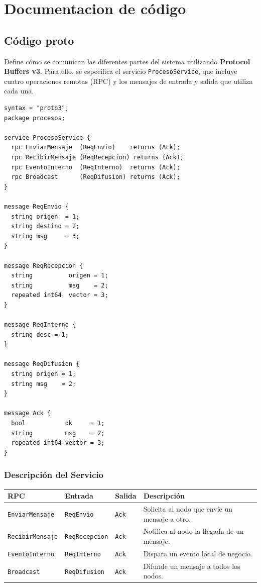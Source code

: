 \documentclass[letterpaper,11pt]{article}
\begin{document}
\newpage
\section{Documentacion de código}

\subsection{Código proto}
Define cómo se comunican las diferentes partes del sistema utilizando 
\textbf{Protocol Buffers v3}. Para ello, se especifica el servicio 
\texttt{ProcesoService}, que incluye cuatro operaciones remotas (RPC) y 
los mensajes de entrada y salida que utiliza cada una.

\begin{lstlisting}[style=proto, caption={procesos.proto - Definición IDL del servicio gRPC}]
syntax = "proto3";
package procesos;
 
service ProcesoService {
  rpc EnviarMensaje  (ReqEnvio)    returns (Ack);
  rpc RecibirMensaje (ReqRecepcion) returns (Ack);
  rpc EventoInterno  (ReqInterno)  returns (Ack);
  rpc Broadcast      (ReqDifusion) returns (Ack);
}
 
message ReqEnvio {
  string origen  = 1;
  string destino = 2;
  string msg     = 3;
}
 
message ReqRecepcion {
  string          origen = 1;
  string          msg    = 2;
  repeated int64  vector = 3;
}
 
message ReqInterno {
  string desc = 1;
}
 
message ReqDifusion {
  string origen = 1;
  string msg    = 2;
}
 
message Ack {
  bool           ok     = 1;
  string         msg    = 2;
  repeated int64 vector = 3;
}
\end{lstlisting}
 
\subsubsection{Descripción del Servicio}
 
\begin{center}
\begin{tabular}{>{\ttfamily}l l l p{5cm}}
\toprule
\textbf{RPC} & \textbf{Entrada} & \textbf{Salida} & \textbf{Descripción} \\
\midrule
\texttt{EnviarMensaje}  & \texttt{ReqEnvio}     & \texttt{Ack} & Solicita al nodo que envíe un mensaje a otro. \\[4pt]
\texttt{RecibirMensaje} & \texttt{ReqRecepcion} & \texttt{Ack} & Notifica al nodo la llegada de un mensaje. \\[4pt]
\texttt{EventoInterno}  & \texttt{ReqInterno}   & \texttt{Ack} & Dispara un evento local de negocio. \\[4pt]
\texttt{Broadcast}      & \texttt{ReqDifusion}  & \texttt{Ack} & Difunde un mensaje a todos los nodos. \\
\bottomrule
\end{tabular}
\end{center}
\end{document}

